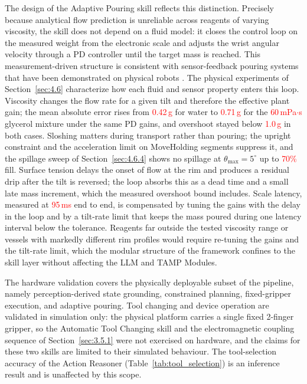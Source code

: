 \documentclass{ieeeaccess}
\newif\ifhighlight
\newcommand{\rev}[1]{\ifhighlight\hl{#1}\else#1\fi}
\newcommand{\nd}[1]{\textcolor{red}{#1}}
\begin{document}
The design of the Adaptive Pouring skill reflects this distinction. Precisely because analytical flow prediction is unreliable across reagents of varying viscosity, the skill does not depend on a fluid model: it closes the control loop on the measured weight from the electronic scale and adjusts the wrist angular velocity through a PD controller until the target mass is reached. This measurement-driven structure is consistent with sensor-feedback pouring systems that have been demonstrated on physical robots \cite{ref21, ref22}. \rev{The physical experiments of Section~\ref{sec:4.6} characterize how each fluid and sensor property enters this loop.
Viscosity changes the flow rate for a given tilt and therefore the effective plant gain; the mean absolute error rises from \nd{0.42\,g} for water to \nd{0.71\,g} for the \nd{60\,mPa$\cdot$s} glycerol mixture under the same PD gains, and overshoot stayed below \nd{1.0\,g} in both cases.
Sloshing matters during transport rather than pouring; the upright constraint and the acceleration limit on MoveHolding segments suppress it, and the spillage sweep of Section~\ref{sec:4.6.4} shows no spillage at $\theta_{\max}=5^\circ$ up to \nd{70\%} fill.
Surface tension delays the onset of flow at the rim and produces a residual drip after the tilt is reversed; the loop absorbs this as a dead time and a small late mass increment, which the measured overshoot bound includes.
Scale latency, measured at \nd{95\,ms} end to end, is compensated by tuning the gains with the delay in the loop and by a tilt-rate limit that keeps the mass poured during one latency interval below the tolerance.
Reagents far outside the tested viscosity range or vessels with markedly different rim profiles would require re-tuning the gains and the tilt-rate limit, which the modular structure of the framework confines to the skill layer without affecting the LLM and TAMP Modules.}

\rev{The hardware validation covers the physically deployable subset of the pipeline, namely perception-derived state grounding, constrained planning, fixed-gripper execution, and adaptive pouring.
Tool changing and device operation are validated in simulation only: the physical platform carries a single fixed 2-finger gripper, so the Automatic Tool Changing skill and the electromagnetic coupling sequence of Section~\ref{sec:3.5.1} were not exercised on hardware, and the claims for these two skills are limited to their simulated behaviour.
The tool-selection accuracy of the Action Reasoner (Table~\ref{tab:tool_selection}) is an inference result and is unaffected by this scope.}
\end{document}
